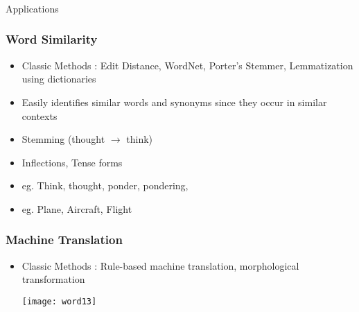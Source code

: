 


\begin{frame}[fragile]\frametitle{}

\begin{center}
{\Large Applications}
\end{center}
\end{frame}




\begin{frame}[fragile]\frametitle{Word Similarity}
\begin{itemize}
\item Classic Methods :  Edit Distance, WordNet, Porter's Stemmer, Lemmatization using dictionaries
\item Easily identifies similar words and synonyms since they occur in similar contexts
\item Stemming (thought $\rightarrow$ think) 
\item Inflections, Tense forms
\item eg. Think, thought, ponder, pondering,
\item eg. Plane, Aircraft, Flight
\end{itemize}
\end{frame}


\begin{frame}[fragile]\frametitle{Machine Translation}

\begin{itemize}
\item Classic Methods :  Rule-based machine translation, morphological transformation
\begin{center}
\texttt{[image: word13]}
\end{center}
\end{itemize}
\end{frame}

